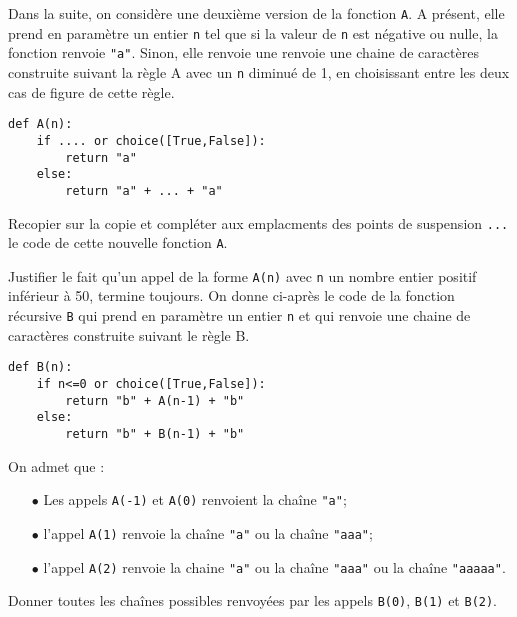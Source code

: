 \documentclass[11pt,a4paper]{article}
\begin{document}
Dans la suite, on considère une deuxième version de la fonction {\tt A}. A présent, elle prend en paramètre un entier {\tt n} tel que si la valeur de {\tt n} est négative ou nulle, la fonction renvoie {\tt "a"}. Sinon, elle renvoie une renvoie une chaine de caractères construite suivant la règle A avec un {\tt n} diminué de 1, en choisissant entre les deux cas de figure de cette règle.
\begin{lstlisting}
def A(n):
    if .... or choice([True,False]):
        return "a"
    else:
        return "a" + ... + "a"
\end{lstlisting}

\item 
\SQListe
    \item Recopier sur la copie et compléter aux emplacments des points de suspension {\tt ...} le code de cette nouvelle fonction {\tt A}.
    \item Justifier le fait qu'un appel de la forme {\tt A(n)} avec {\tt n} un nombre entier positif inférieur à 50, termine toujours.
\FinListe
On donne ci-après le code de la fonction récursive {\tt B} qui prend en paramètre un entier {\tt n} et qui renvoie une chaine de caractères construite suivant le règle B.
\begin{lstlisting}
def B(n):
    if n<=0 or choice([True,False]):
        return "b" + A(n-1) + "b"
    else:
        return "b" + B(n-1) + "b"
\end{lstlisting}
On admet que :
\begin{itemize}
    \item[$\bullet$] Les appels {\tt A(-1)} et {\tt A(0)} renvoient la chaîne {\tt "a"};
    \item[$\bullet$] l'appel {\tt A(1)} renvoie la chaîne {\tt "a"} ou la chaîne {\tt "aaa"};
    \item[$\bullet$] l'appel {\tt A(2)} renvoie la chaine {\tt "a"} ou la chaîne {\tt "aaa"} ou la chaîne {\tt "aaaaa"}.
\end{itemize}
\item Donner toutes les chaînes possibles renvoyées par les appels {\tt B(0)}, {\tt B(1)} et {\tt B(2)}.
\end{document}
